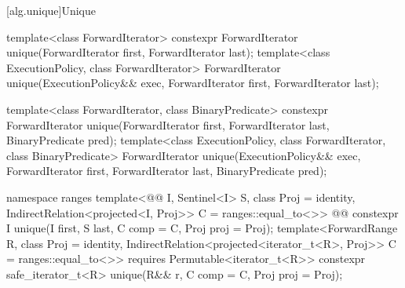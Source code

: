 [alg.unique]{Unique}

%
\begin{itemdecl}
template<class ForwardIterator>
  constexpr ForwardIterator unique(ForwardIterator first, ForwardIterator last);
template<class ExecutionPolicy, class ForwardIterator>
  ForwardIterator unique(ExecutionPolicy&& exec,
                         ForwardIterator first, ForwardIterator last);

template<class ForwardIterator, class BinaryPredicate>
  constexpr ForwardIterator unique(ForwardIterator first, ForwardIterator last,
                                   BinaryPredicate pred);
template<class ExecutionPolicy, class ForwardIterator, class BinaryPredicate>
  ForwardIterator unique(ExecutionPolicy&& exec,
                         ForwardIterator first, ForwardIterator last,
                         BinaryPredicate pred);
\end{itemdecl}
\begin{addedblock}
\begin{itemdecl}
namespace ranges {
  template<@@ I, Sentinel<I> S, class Proj = identity,
      IndirectRelation<projected<I, Proj>> C = ranges::equal_to<>>
    @@
    constexpr I unique(I first, S last, C comp = C{}, Proj proj = Proj{});
  template<ForwardRange R, class Proj = identity,
      IndirectRelation<projected<iterator_t<R>, Proj>> C = ranges::equal_to<>>
    requires Permutable<iterator_t<R>>
    constexpr safe_iterator_t<R>
      unique(R&& r, C comp = C{}, Proj proj = Proj{});
}
\end{itemdecl}
\end{addedblock}

